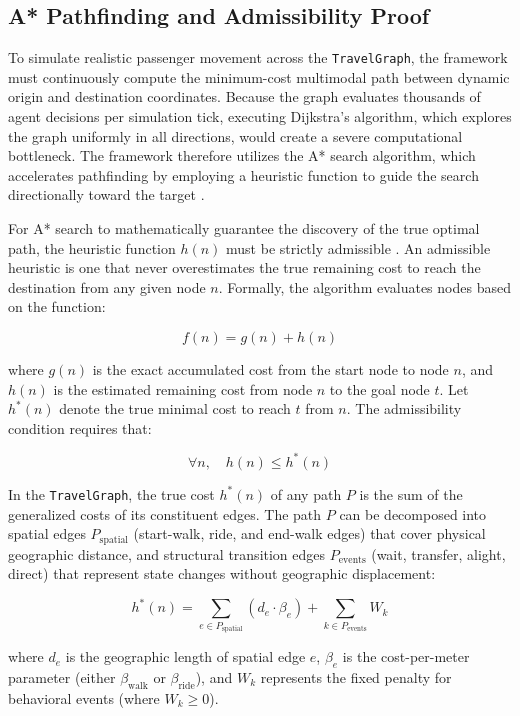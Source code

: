 {{\subsection{A* Pathfinding and Admissibility Proof}
\label{subsec:3.4.5 astar_proof}
\noindent
To simulate realistic passenger movement across the \texttt{TravelGraph}, the framework must continuously compute the minimum-cost multimodal path between dynamic origin and destination coordinates. Because the graph evaluates thousands of agent decisions per simulation tick, executing Dijkstra's algorithm, which explores the graph uniformly in all directions, would create a severe computational bottleneck. The framework therefore utilizes the A* search algorithm, which accelerates pathfinding by employing a heuristic function to guide the search directionally toward the target \citep{russell2010artificial}.

For A* search to mathematically guarantee the discovery of the true optimal path, the heuristic function $h(n)$ must be strictly admissible \citep{russell2010artificial}. An admissible heuristic is one that never overestimates the true remaining cost to reach the destination from any given node $n$. Formally, the algorithm evaluates nodes based on the function:

$$f(n) = g(n) + h(n)$$

where $g(n)$ is the exact accumulated cost from the start node to node $n$, and $h(n)$ is the estimated remaining cost from node $n$ to the goal node $t$. Let $h^*(n)$ denote the true minimal cost to reach $t$ from $n$. The admissibility condition requires that:

$$\forall n, \quad h(n) \leq h^*(n)$$

In the \texttt{TravelGraph}, the true cost $h^*(n)$ of any path $P$ is the sum of the generalized costs of its constituent edges. The path $P$ can be decomposed into spatial edges $P_{\mathrm{spatial}}$ (start-walk, ride, and end-walk edges) that cover physical geographic distance, and structural transition edges $P_{\mathrm{events}}$ (wait, transfer, alight, direct) that represent state changes without geographic displacement:

$$h^*(n) = \sum_{e \in P_{\mathrm{spatial}}} (d_e \cdot \beta_e) + \sum_{k \in P_{\mathrm{events}}} W_k$$

where $d_e$ is the geographic length of spatial edge $e$, $\beta_e$ is the cost-per-meter parameter (either $\beta_{\mathrm{walk}}$ or $\beta_{\mathrm{ride}}$), and $W_k$ represents the fixed penalty for behavioral events (where $W_k \geq 0$). 

}}
